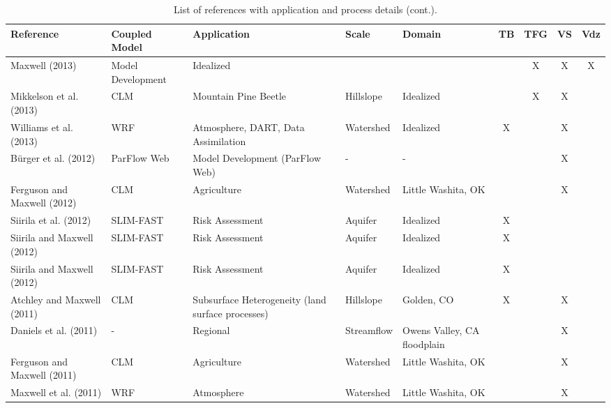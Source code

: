 {\begin{table} \center
\renewcommand{\arraystretch}{2.5}
\center
\caption{List of \parflow{} references with application and process details (cont.).}

\begin{tabular}{ l  p{1.5cm} p{2cm} p{1.5cm} p{1.5cm} | c | c | c | c }
\bf{Reference} & \bf{Coupled Model} & \bf{Application} & \bf{Scale} & \bf{Domain} & \bf{TB} & \bf{TFG} & \bf{VS} & \bf{Vdz} \\   
\hline{}

\cite{M13} Maxwell (2013) & Model Development & Idealized &   &   &   & X & X & X   \\
\cite{Mikkelson13} Mikkelson et al. (2013) & CLM & Mountain Pine Beetle & Hillslope & Idealized &   & X & X &     \\
\cite{Williams13} Williams et al. (2013) & WRF & Atmosphere, DART, Data Assimilation & Watershed & Idealized & X &   & X &     \\
\cite{Burger12} B{\"u}rger et al. (2012) & ParFlow Web & Model Development (ParFlow Web)& - & - &   &   & X &     \\
\cite{Ferg12} Ferguson and Maxwell (2012) & CLM & Agriculture & Watershed & Little Washita, OK  &   &   & X &     \\
\cite{SNSMM10} Siirila et al. (2012) & SLIM-FAST & Risk Assessment & Aquifer & Idealized  & X &   &   &     \\
\cite{Siirila12a} Siirila and Maxwell (2012) & SLIM-FAST & Risk Assessment & Aquifer & Idealized  & X &   &   &     \\
\cite{Siirila12b} Siirila and Maxwell (2012) & SLIM-FAST & Risk Assessment & Aquifer & Idealized  & X &   &   &     \\
\cite{AM10} Atchley and Maxwell (2011) & CLM & Subsurface Heterogeneity (land surface processes) & Hillslope & Golden, CO  & X &   & X &     \\
\cite{DMC10} Daniels et al. (2011) & - & Regional & Streamflow & Owens Valley, CA floodplain  &   &   & X &     \\
\cite{Ferg11} Ferguson and Maxwell (2011) & CLM & Agriculture & Watershed & Little Washita, OK  &   &   & X &     \\
\cite{MLMSWT10} Maxwell et al. (2011) & WRF & Atmosphere & Watershed  & Little Washita, OK  &   &   & X &     \\
\end{tabular}
\label{pfref4}
\end{table}

}
